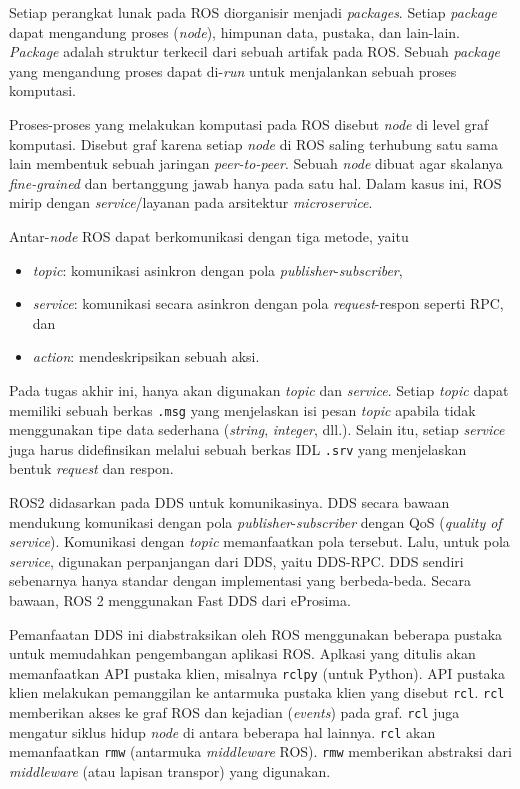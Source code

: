 Setiap perangkat lunak pada ROS diorganisir menjadi \textit{packages}. Setiap
\textit{package} dapat mengandung proses (\textit{node}), himpunan data,
pustaka, dan lain-lain. \textit{Package} adalah struktur terkecil dari sebuah
artifak pada ROS. Sebuah \textit{package} yang mengandung proses dapat
di-\textit{run} untuk menjalankan sebuah proses komputasi.

Proses-proses yang melakukan komputasi pada ROS disebut \textit{node} di level
graf komputasi. Disebut graf karena setiap \textit{node} di ROS saling terhubung
satu sama lain membentuk sebuah jaringan \textit{peer-to-peer}. Sebuah
\textit{node} dibuat agar skalanya \textit{fine-grained} dan bertanggung jawab
hanya pada satu hal. Dalam kasus ini, ROS mirip dengan \textit{service}/layanan
pada arsitektur \textit{microservice}.

Antar-\textit{node} ROS dapat berkomunikasi dengan tiga metode, yaitu
\begin{itemize}
    \item \textit{topic}: komunikasi asinkron dengan pola
          \textit{publisher}-\textit{subscriber},
    \item \textit{service}: komunikasi secara asinkron dengan pola
          \textit{request}-respon seperti RPC, dan
    \item \textit{action}: mendeskripsikan sebuah aksi.
\end{itemize}
Pada tugas akhir ini, hanya akan digunakan \textit{topic} dan \textit{service}.
Setiap \textit{topic} dapat memiliki sebuah berkas \texttt{.msg} yang
menjelaskan isi pesan \textit{topic} apabila tidak menggunakan tipe data
sederhana (\textit{string}, \textit{integer}, dll.). Selain itu, setiap
\textit{service} juga harus didefinsikan melalui sebuah berkas IDL \texttt{.srv}
yang menjelaskan bentuk \textit{request} dan respon.

ROS2 didasarkan pada DDS untuk komunikasinya. DDS secara bawaan mendukung
komunikasi dengan pola \textit{publisher}-\textit{subscriber} dengan QoS
(\textit{quality of service}). Komunikasi dengan \textit{topic} memanfaatkan
pola tersebut. Lalu, untuk pola \textit{service}, digunakan perpanjangan dari
DDS, yaitu DDS-RPC. DDS sendiri sebenarnya hanya standar dengan implementasi
yang berbeda-beda. Secara bawaan, ROS 2 menggunakan Fast DDS dari eProsima.

Pemanfaatan DDS ini diabstraksikan oleh ROS menggunakan beberapa pustaka untuk
memudahkan pengembangan aplikasi ROS. Aplkasi yang ditulis akan memanfaatkan
API pustaka klien, misalnya \texttt{rclpy} (untuk Python). API pustaka klien
melakukan pemanggilan ke antarmuka pustaka klien yang disebut \texttt{rcl}.
\texttt{rcl} memberikan akses ke graf ROS dan kejadian (\textit{events}) pada
graf. \texttt{rcl} juga mengatur siklus hidup \textit{node} di antara beberapa
hal lainnya. \texttt{rcl} akan memanfaatkan \texttt{rmw} (antarmuka
\textit{middleware} ROS). \texttt{rmw} memberikan abstraksi dari
\textit{middleware} (atau lapisan transpor) yang digunakan.


